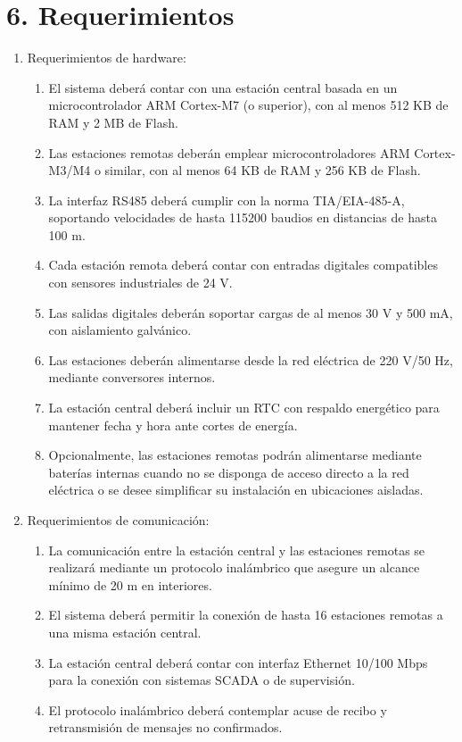 \documentclass[
11pt, %
]{charter}
\begin{document}
\section{6. Requerimientos}
\label{sec:requerimientos}

\begin{enumerate}
	\item Requerimientos de hardware:
		\begin{enumerate}
			\item El sistema deberá contar con una estación central basada en un microcontrolador ARM Cortex-M7 (o superior), con al menos 512 KB de RAM y 2 MB de Flash.
			\item Las estaciones remotas deberán emplear microcontroladores ARM Cortex-M3/M4 o similar, con al menos 64 KB de RAM y 256 KB de Flash.
			\item La interfaz RS485 deberá cumplir con la norma TIA/EIA-485-A, soportando velocidades de hasta 115200 baudios en distancias de hasta 100 m.
			\item Cada estación remota deberá contar con entradas digitales compatibles con sensores industriales de 24 V.
			\item Las salidas digitales deberán soportar cargas de al menos 30 V y 500 mA, con aislamiento galvánico.
			\item Las estaciones deberán alimentarse desde la red eléctrica de 220 V/50 Hz, mediante conversores internos.
			\item La estación central deberá incluir un RTC con respaldo energético para mantener fecha y hora ante cortes de energía.
			\item Opcionalmente, las estaciones remotas podrán alimentarse mediante baterías internas cuando no se disponga de acceso directo a la red eléctrica o se desee simplificar su instalación en ubicaciones aisladas.
		\end{enumerate}
		
	\item Requerimientos de comunicación:
		\begin{enumerate}
			\item La comunicación entre la estación central y las estaciones remotas se realizará mediante un protocolo inalámbrico que asegure un alcance mínimo de 20 m en interiores.
			\item El sistema deberá permitir la conexión de hasta 16 estaciones remotas a una misma estación central.
			\item La estación central deberá contar con interfaz Ethernet 10/100 Mbps para la conexión con sistemas SCADA o de supervisión.
			\item El protocolo inalámbrico deberá contemplar acuse de recibo y retransmisión de mensajes no confirmados.
		\end{enumerate}
		

\end{enumerate}
\end{document}
